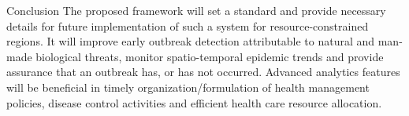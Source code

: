 {{Conclusion
The proposed framework will set a standard and provide necessary details for future implementation of such a system for resource-constrained regions. It will improve early outbreak detection attributable to natural and man-made biological threats, monitor spatio-temporal epidemic trends and provide assurance that an outbreak has, or has not occurred. Advanced analytics features will be beneficial in timely organization/formulation of health management policies, disease control activities and efficient health care resource allocation.}
}